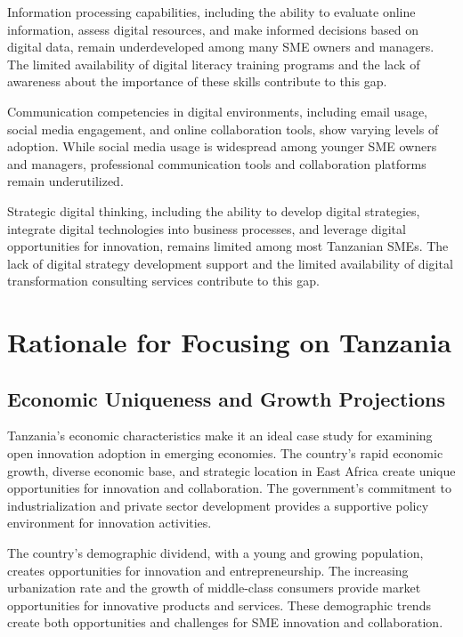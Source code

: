 \documentclass[12pt,a4paper]{article}
\begin{document}
Information processing capabilities, including the ability to evaluate online information, assess digital resources, and make informed decisions based on digital data, remain underdeveloped among many SME owners and managers. The limited availability of digital literacy training programs and the lack of awareness about the importance of these skills contribute to this gap.

Communication competencies in digital environments, including email usage, social media engagement, and online collaboration tools, show varying levels of adoption. While social media usage is widespread among younger SME owners and managers, professional communication tools and collaboration platforms remain underutilized.

Strategic digital thinking, including the ability to develop digital strategies, integrate digital technologies into business processes, and leverage digital opportunities for innovation, remains limited among most Tanzanian SMEs. The lack of digital strategy development support and the limited availability of digital transformation consulting services contribute to this gap.

\section{Rationale for Focusing on Tanzania}

\subsection{Economic Uniqueness and Growth Projections}

Tanzania's economic characteristics make it an ideal case study for examining open innovation adoption in emerging economies. The country's rapid economic growth, diverse economic base, and strategic location in East Africa create unique opportunities for innovation and collaboration. The government's commitment to industrialization and private sector development provides a supportive policy environment for innovation activities.

The country's demographic dividend, with a young and growing population, creates opportunities for innovation and entrepreneurship. The increasing urbanization rate and the growth of middle-class consumers provide market opportunities for innovative products and services. These demographic trends create both opportunities and challenges for SME innovation and collaboration.
\end{document}
